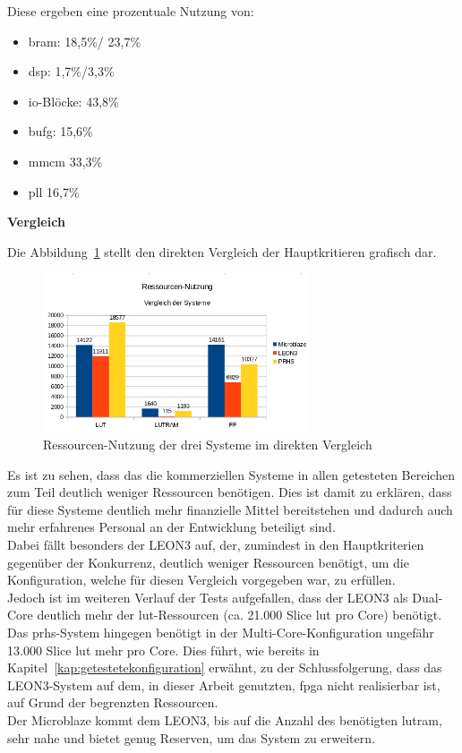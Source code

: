 Diese ergeben eine prozentuale Nutzung von:\\
\begin{itemize}
  \item \ac{bram}: 18,5\%/ 23,7\%
  \item \ac{dsp}:  1,7\%/3,3\%
  \item \ac{io}-Blöcke: 43,8\%
  \item \ac{bufg}: 15,6\%
  \item \ac{mmcm} 33,3\%
  \item \ac{pll} 16,7\%
\end{itemize}


\textbf{Vergleich}

Die Abbildung~\ref{fig:ressourcenresult} stellt den direkten Vergleich der Hauptkritieren grafisch dar.\\

\begin{figure}[H]
\centering
\includegraphics[width=0.7\textwidth]{Hauptteil/ressourcenresult.png}
\caption{Ressourcen-Nutzung der drei Systeme im direkten Vergleich}
\label{fig:ressourcenresult}
\end{figure}

Es ist zu sehen, dass das die kommerziellen Systeme in allen getesteten Bereichen zum Teil deutlich weniger Ressourcen benötigen.
Dies ist damit zu erklären, dass für diese Systeme deutlich mehr finanzielle Mittel bereitstehen und dadurch auch mehr
erfahrenes Personal an der Entwicklung beteiligt sind.\\
Dabei fällt besonders der LEON3 auf, der, zumindest in den Hauptkriterien gegenüber der Konkurrenz, deutlich weniger Ressourcen
benötigt, um die Konfiguration, welche für diesen Vergleich vorgegeben war, zu erfüllen.\\ Jedoch ist im weiteren Verlauf der Tests aufgefallen, dass der LEON3 als Dual-Core deutlich mehr
 der \ac{lut}-Ressourcen (ca. 21.000 Slice \ac{lut} pro Core) benötigt. Das \ac{prhs}-System hingegen benötigt in der Multi-Core-Konfiguration ungefähr 13.000 Slice \ac{lut} mehr pro Core.
Dies führt, wie bereits in Kapitel~\ref{kap:getestetekonfiguration} erwähnt, zu der Schlussfolgerung, dass das LEON3-System auf dem, in dieser Arbeit genutzten, \ac{fpga} nicht realisierbar ist,
auf Grund der begrenzten Ressourcen.\\
 Der Microblaze kommt dem LEON3, bis auf die Anzahl des benötigten \ac{lutram}, sehr nahe und bietet genug Reserven, um das System zu erweitern.\\

